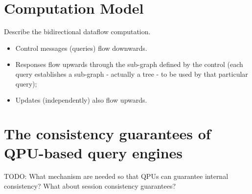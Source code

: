 \section{Computation Model}
Describe the bidirectional dataflow computation.
\begin{itemize}
  \item Control messages (queries) flow downwards.
  \item Responses flow upwards through the sub-graph defined by the control
  (each query establishes a sub-graph - actually a tree - to be used by that
  particular query);
  \item Updates (independently) also flow upwards.
\end{itemize}


\section{The consistency guarantees of QPU-based query engines}
TODO: What mechanism are needed so that QPUs can guarantee internal consistency?
What about session consistency guarantees?
